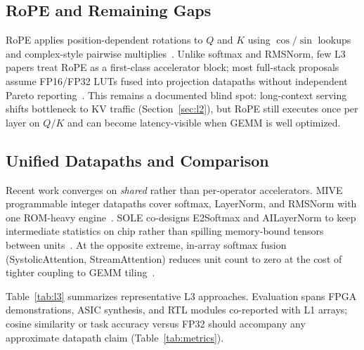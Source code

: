\documentclass[conference]{IEEEtran}
\begin{document}
\subsection{RoPE and Remaining Gaps}
\label{sec:l3-rope}

RoPE applies position-dependent rotations to $Q$ and $K$ using $\cos/\sin$ lookups and complex-style pairwise multiplies~\cite{su2024roformer}.
Unlike softmax and RMSNorm, few L3 papers treat RoPE as a first-class accelerator block; most full-stack proposals assume FP16/FP32 LUTs fused into projection datapaths without independent Pareto reporting~\cite{plena2025,wang2023cosa,desa2025}.
This remains a documented blind spot: long-context serving shifts bottleneck to KV traffic (Section~\ref{sec:l2}), but RoPE still executes once per layer on $Q/K$ and can become latency-visible when GEMM is well optimized.

\subsection{Unified Datapaths and Comparison}
\label{sec:l3-unified}

Recent work converges on \emph{shared} rather than per-operator accelerators.
MIVE programmable integer datapaths cover softmax, LayerNorm, and RMSNorm with one ROM-heavy engine~\cite{mive2026}.
SOLE co-designs E2Softmax and AILayerNorm to keep intermediate statistics on chip rather than spilling memory-bound tensors between units~\cite{sole2025}.
At the opposite extreme, in-array softmax fusion (SystolicAttention, StreamAttention) reduces unit count to zero at the cost of tighter coupling to GEMM tiling~\cite{lin2025systolicattention,streamattention2025}.

Table~\ref{tab:l3} summarizes representative L3 approaches.
Evaluation spans FPGA demonstrations, ASIC synthesis, and RTL modules co-reported with L1 arrays; cosine similarity or task accuracy versus FP32 should accompany any approximate datapath claim (Table~\ref{tab:metrics}).
\end{document}
